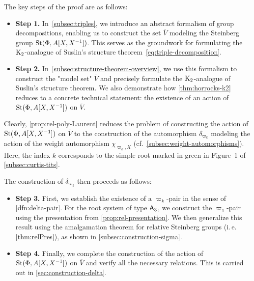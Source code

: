 The key steps of the proof are as follows:
\begin{itemize}
    \item \textbf{Step 1.} In~\cref{subsec:triples}, we introduce an abstract formalism of group decompositions, enabling us to construct the set \( \overline{V} \) modeling
    the Steinberg group \( \operatorname{St}(\Phi, A[X, X^{-1}]) \). This serves as the groundwork for formulating the \( \operatorname{K}_2 \)-analogue of Suslin's structure theorem~\eqref{eq:triple-decomposition}.
    \item \textbf{Step 2.} In~\cref{subsec:structure-theorem-overview}, we use this formalism to construct the "model set" \( \overline{V} \) and precisely formulate the \( \operatorname{K}_2 \)-analogue
    of Suslin's structure theorem. We also demonstrate how \cref{thm:horrocks-k2} reduces to a concrete technical statement: the existence of an action of \( \operatorname{St}(\Phi, A[X, X^{-1}]) \) on \( \overline{V} \).
\end{itemize}

Clearly, \cref{prop:rel-poly-Laurent} reduces the problem of constructing the action of \( \operatorname{St}(\Phi, A[X, X^{-1}]) \) on \( \overline{V} \) to the construction of
the automorphism \( \delta_{\varpi_k} \) modeling the action of the weight automorphism \( \chi_{\varpi_k, X} \) (cf.~\cref{subsec:weight-automorphisms}).
Here, the index \( k \) corresponds to the simple root marked in green in Figure~1 of \cref{subsec:curtis-tits}.

The construction of \( \delta_{\varpi_k} \) then proceeds as follows:
\begin{itemize}
    \item \textbf{Step 3.} First, we establish the existence of a \( \varpi_k \)-pair in the sense of \cref{dfn:delta-pair}.
    For the root system of type \( \mathsf{A}_3 \), we construct the \( \varpi_1 \)-pair using the presentation from \cref{prop:rel-presentation}.
    We then generalize this result using the amalgamation theorem for relative Steinberg groups (i.\,e. \cref{thm:relPres}), as shown in \cref{subsec:construction-sigma}.
    \item \textbf{Step 4.} Finally, we complete the construction of the action of \( \operatorname{St}(\Phi, A[X, X^{-1}]) \) on \( \overline{V} \) and verify all the necessary relations.
    This is carried out in \cref{sec:construction-delta}.
\end{itemize}

